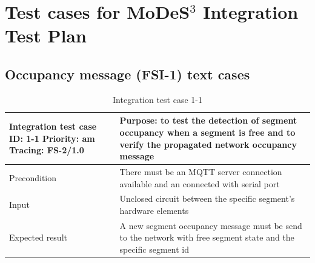 \section{Test cases for MoDeS$^3$ Integration Test Plan} \label{appendix:IntTC}
\subsection{Occupancy message (FSI-1) text cases} 
\begin{table}[H]
	\caption{Integration test case 1-1}
	\label{table:TCase-FSI1-1}
	\begin{center}
		\renewcommand{\arraystretch}{1.8}
		\begin{tabu} 
			to 0.9 \textwidth
			{  X[0.4, c] X[c] }
			\toprule
			Integration test case ID: 1-1 \newline Priority: am \newline Tracing: FS-2/1.0 & Purpose: to test the detection of segment occupancy when a segment is free and to verify the propagated network occupancy message \\ \midrule
			Precondition                                                                   & There must be an MQTT server connection available and an connected with serial port                                               \\
			Input                                                                          & Unclosed circuit between the specific segment's hardware elements                                                                 \\
			Expected result                                                                & A new segment occupancy message must be send to the network with free segment state  and the specific segment id                          \\ \bottomrule
		\end{tabu}
	\end{center}
\end{table} 

